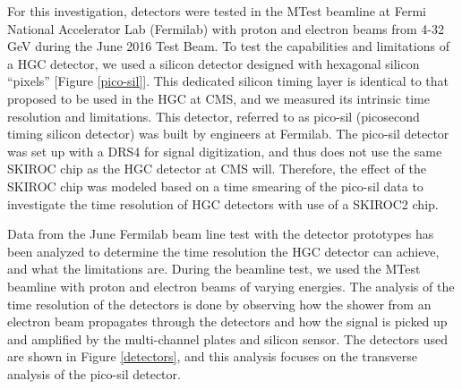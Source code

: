 \documentclass[twocolumn,aps,prd,reprint]{revtex4-1}
\begin{document}
For this investigation, detectors were tested in the MTest beamline at Fermi National Accelerator Lab (Fermilab) with proton and electron beams from 4-32 GeV during the June 2016 Test Beam. To test the capabilities and limitations of a HGC detector, we used a silicon detector designed with hexagonal silicon ``pixels'' [Figure \ref{pico-sil}]. This dedicated silicon timing layer is identical to that proposed to be used in the HGC at CMS, and we measured its intrinsic time resolution and limitations. This detector, referred to as pico-sil (picosecond timing silicon detector) was built by engineers at Fermilab. The pico-sil detector was set up with a DRS4 for signal digitization, and thus does not use the same SKIROC chip as the HGC detector at CMS will. Therefore, the effect of the SKIROC chip was modeled based on a time smearing of the pico-sil data to investigate the time resolution of HGC detectors with use of a SKIROC2 chip.

Data from the June Fermilab beam line test with the detector prototypes has been analyzed to determine the time resolution the HGC detector can achieve, and what the limitations are. During the beamline test, we used the MTest beamline with proton and electron beams of varying energies. The analysis of the time resolution of the detectors is done by observing how the shower from an electron beam propagates through the detectors and how the signal is picked up and amplified by the multi-channel plates and silicon sensor. The detectors used are shown in Figure \ref{detectors}, and this analysis focuses on the transverse analysis of the pico-sil detector.
\end{document}
